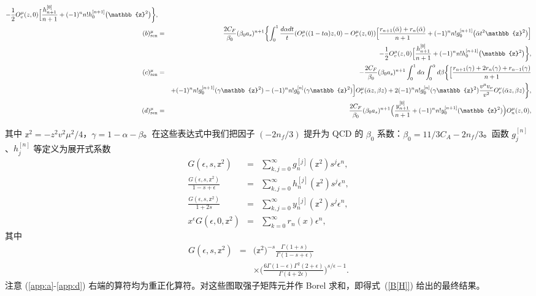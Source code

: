 \begin{widetext}
\begin{eqnarray}
\hfill-\frac{1}{2}O_v^\mu(z,0)\Big[\frac{h_{n+1}^{[0]}}{n+1}+(-1)^nn!h_0^{[n+1]}\big(\mathbb{z}^2\big)\biggr\},
\\
(b)^\mu_{\text{ren}}&=&\frac{2C_F}{\beta_0}(\beta_0 a_s)^{n+1}\biggl\{\int_0^1\frac{d\alpha dt}{t}  (O_v^\mu((1-t\alpha) z,0)-O_v^\mu(z,0))\Big[
\frac{r_{n+1}(\bar \alpha)+r_n(\bar \alpha)}{n+1}+(-1)^nn!g_0^{[n+1]}\big(\bar \alpha t^2\mathbb{z}^2\big)\Big]
\\\nonumber && 
\hfill-\frac{1}{2}O_v^\mu(z,0)\Big[\frac{h_{n+1}^{[0]}}{n+1}+(-1)^nn!h_0^{[n+1]}\big(\mathbb{z}^2\big)\biggr\},
\\
(c)^\mu_{\text{ren}}&=&-\frac{2C_F}{\beta_0}(\beta_0 a_s)^{n+1}\int_0^1 d\alpha \int_0^{\bar \alpha} d\beta\biggl\{\Big[\frac{r_{n+1}(\gamma)+2r_n(\gamma)+r_{n-1}(\gamma)}{n+1}
\\\nonumber && +(-1)^nn!g_0^{[n+1]}(\gamma \mathbb{z}^2)-(-1)^nn!g_0^{[n]}(\gamma \mathbb{z}^2)\Big]O_v^\mu(\bar \alpha z,\beta z)
+2(-1)^n n!g_0^{[n]}(\gamma \mathbb{z}^2)\frac{v^\mu v_\nu}{v^2}O_v^\nu(\bar \alpha z,\beta z)\biggr\},
\\\label{app:d}
(d)^\mu_{\text{ren}}&=&\frac{2C_F}{\beta_0}(\beta_0 a_s)^{n+1}\Big(\frac{y_{n+1}^{[0]}}{n+1}+(-1)^nn!y_0^{[n+1]}(\mathbb{z}^2)\Big)O_n^{\mu}(z,0),
\end{eqnarray}
\end{widetext}
其中 $\mathbb{z}^2=-z^2 v^2\mu^2/4$，$\gamma=1-\alpha-\beta$。在这些表达式中我们把因子 $(-2n_f/3)$ 提升为 QCD 的 $\beta_0$ 系数：$\beta_0=11/3C_A-2n_f/3$。函数 $g_j^{[n]}$、$h_j^{[n]}$ 等定义为展开式系数
\begin{eqnarray}
G(\epsilon,s,\mathbb{z}^2)&=&\sum_{k,j=0}^\infty g_n^{[j]}(\mathbb{z}^2)s^j \epsilon^n,
\\
\frac{G(\epsilon,s,\mathbb{z}^2)}{1-s+\epsilon}&=&\sum_{k,j=0}^\infty h_n^{[j]}(\mathbb{z}^2)s^j \epsilon^n,
\\
\frac{G(\epsilon,s,\mathbb{z}^2)}{1+2s}&=&\sum_{k,j=0}^\infty y_n^{[j]}(\mathbb{z}^2)s^j \epsilon^n,
\\
x^\epsilon G(\epsilon,0,\mathbb{z}^2)&=&\sum_{k=0}^\infty r_n(x) \epsilon^n,
\end{eqnarray}
其中
\begin{eqnarray}
G(\epsilon,s,\mathbb{z}^2)&=&\Big(\mathbb{z}^2\Big)^{-s}\frac{\Gamma(1+s)}{\Gamma(1-s+\epsilon)}
\\\nonumber && \times \Bigg(\frac{6 \Gamma(1-\epsilon)\Gamma^2(2+\epsilon)}{\Gamma(4+2\epsilon)}\Bigg)^{s/\epsilon-1}.
\end{eqnarray}
注意 (\ref{app:a}-\ref{app:d}) 右端的算符均为重正化算符。对这些图取强子矩阵元并作 Borel 求和，即得式~(\ref{B[H]}) 给出的最终结果。

